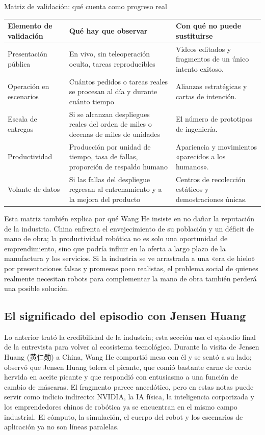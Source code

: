 \documentclass[a4paper]{article}
\begin{document}
\begin{knowledgebox}{Matriz de validación: qué cuenta como progreso real}
\begin{tabularx}{\textwidth}{p{}p{}X}
\toprule
Elemento de validación & Qué hay que observar & Con qué no puede sustituirse \\
\midrule
Presentación pública & En vivo, sin teleoperación oculta, tareas reproducibles & Videos editados y fragmentos de un único intento exitoso. \\
Operación en escenarios & Cuántos pedidos o tareas reales se procesan al día y durante cuánto tiempo & Alianzas estratégicas y cartas de intención. \\
Escala de entregas & Si se alcanzan despliegues reales del orden de miles o decenas de miles de unidades & El número de prototipos de ingeniería. \\
Productividad & Producción por unidad de tiempo, tasa de fallas, proporción de respaldo humano & Apariencia y movimientos «parecidos a los humanos». \\
Volante de datos & Si las fallas del despliegue regresan al entrenamiento y a la mejora del producto & Centros de recolección estáticos y demostraciones únicas. \\
\bottomrule
\end{tabularx}
\end{knowledgebox}

Esta matriz también explica por qué Wang He insiste en no dañar la reputación de la industria. China enfrenta el envejecimiento de su población y un déficit de mano de obra; la productividad robótica no es solo una oportunidad de emprendimiento, sino que podría influir en la oferta a largo plazo de la manufactura y los servicios. Si la industria se ve arrastrada a una «era de hielo» por presentaciones falsas y promesas poco realistas, el problema social de quienes realmente necesitan robots para complementar la mano de obra también perderá una posible solución.

\subsection{El significado del episodio con Jensen Huang}

Lo anterior trató la credibilidad de la industria; esta sección usa el episodio final de la entrevista para volver al ecosistema tecnológico. Durante la visita de Jensen Huang (黄仁勋) a China, Wang He compartió mesa con él y se sentó a su lado; observó que Jensen Huang tolera el picante, que comió bastante carne de cerdo hervida en aceite picante y que respondió con entusiasmo a una función de cambio de máscaras. El fragmento parece anecdótico, pero en estas notas puede servir como indicio indirecto: NVIDIA, la IA física, la inteligencia corporizada y los emprendedores chinos de robótica ya se encuentran en el mismo campo industrial. El cómputo, la simulación, el cuerpo del robot y los escenarios de aplicación ya no son líneas paralelas.
\end{document}
